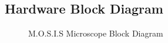\subsection{Hardware Block Diagram}
\begin{figure}[H]
  \begin{center}
    
  \caption{M.O.S.I.S Microscope Block Diagram}
  \end{center}
\end{figure}
